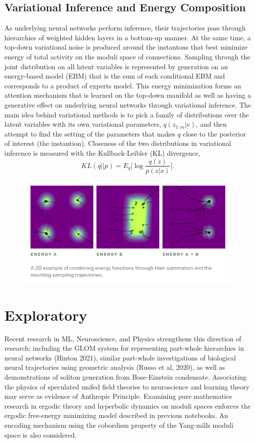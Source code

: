 \documentclass{article}
\begin{document}
\subsection{Variational Inference and Energy Composition}
    As underlying neural networks perform inference, their trajectories pass through hierarchies of weighted hidden layers in a bottom-up manner. At the same time, a top-down variational noise is produced around the instantons that best minimize energy of total activity on the moduli space of connections. Sampling through the joint distribution on all latent variables is represented by generation on an energy-based model (EBM) that is the sum of each conditional EBM and corresponds to a product of experts model. This energy minimization forms an attention mechanism that is learned on the top-down manifold as well as having a generative effect on underlying neural networks through variational inference. The main idea behind variational methods is to pick a family of distributions over the latent variables with its own variational parameters, $q(z_{1:m} | v)$, and then attempt to find the setting of the parameters that makes $q$ close to the posterior of interest (the instantion). Closeness of the two distributions in variational inference is measured with the Kullback-Leibler (KL) divergence, 
    \[
        KL(q||p)=  E_q\bigg[ \log \frac{ q(z)}{p(z | x)} \bigg].
    \]
    \begin{figure}[H]
        \centering
        \includegraphics[width=13cm]{openai-ebm.png}
    \end{figure}
    
\section{Exploratory }
    Recent research in ML, Neuroscience, and Physics strengthens this direction of research; including the GLOM system for representing part-whole hierarchies in neural networks (Hinton 2021), similar part-whole investigations of biological neural trajectories using geometric analysis (Russo et al, 2020), as well as demonstrations of soliton generation from Bose-Einstein condensate. Associating the physics of speculated unifed field theories to neuroscience and learning theory may serve as evidence of Anthropic Principle. Examining pure mathematics research in ergodic theory and hyperbolic dynamics on moduli spaces enforces the ergodic free-energy minimizing model described in previous notebooks. An encoding mechanism using the cobordism property of the Yang-mills moduli space is also considered.
    
\end{document}
